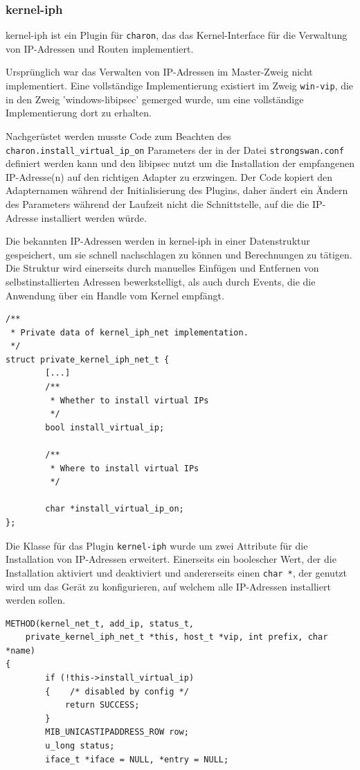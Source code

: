 {\subsubsection{kernel-iph}
kernel-iph ist ein Plugin für \texttt{charon}, das das Kernel-Interface
für die Verwaltung von IP-Adressen und Routen implementiert.

Ursprünglich war das Verwalten von IP-Adressen im Master-Zweig nicht implementiert.
Eine vollständige Implementierung existiert im Zweig \texttt{win-vip}, die in den Zweig 'windows-libipsec'
gemerged wurde, um eine vollständige Implementierung dort zu erhalten.

Nachgerüstet werden musste Code zum Beachten des \texttt{charon.install\_virtual\_ip\_on} Parameters
der in der Datei \texttt{strongswan.conf} definiert werden kann und den libipsec nutzt um
die Installation der empfangenen IP-Adresse(n) auf den richtigen Adapter zu erzwingen.
Der Code kopiert den Adapternamen während der Initialisierung des Plugins, daher
ändert ein Ändern des Parameters während der Laufzeit nicht die Schnittstelle,
auf die die IP-Adresse installiert werden würde.

Die bekannten IP-Adressen werden in kernel-iph in einer Datenstruktur gespeichert,
um sie schnell nachschlagen zu können und Berechnungen zu tätigen. Die Struktur
wird einerseits durch manuelles Einfügen und Entfernen von selbstinstallierten Adressen
bewerkstelligt, als auch durch Events, die die Anwendung über ein Handle
vom Kernel empfängt.

\begin{lstlisting}[caption=Ergänzung zu private\_kernel\_iph\_net\_t,label=lst:kernel_iph]
/**
 * Private data of kernel_iph_net implementation.
 */
struct private_kernel_iph_net_t {
        [...]
        /**
         * Whether to install virtual IPs
         */
        bool install_virtual_ip;

        /**
         * Where to install virtual IPs
         */

        char *install_virtual_ip_on;
};
\end{lstlisting}

Die Klasse für das Plugin \texttt{kernel-iph} wurde um zwei Attribute für die Installation
von \ac{IP}-Adressen erweitert. Einerseits ein boolescher Wert, der die Installation
aktiviert und deaktiviert und andererseits einen \texttt{char *}, der genutzt wird
um das Gerät zu konfigurieren, auf welchem alle \ac{IP}-Adressen installiert werden sollen.

\begin{lstlisting}[caption=Code für add\_ip,label=lst:kernel_iph_add_ip]
METHOD(kernel_net_t, add_ip, status_t,
    private_kernel_iph_net_t *this, host_t *vip, int prefix, char *name)
{
        if (!this->install_virtual_ip)
        {    /* disabled by config */
            return SUCCESS;
        }
        MIB_UNICASTIPADDRESS_ROW row;
        u_long status;
        iface_t *iface = NULL, *entry = NULL;


\end{lstlisting}}
